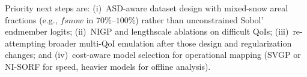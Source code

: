 \documentclass[11pt]{article}
\begin{document}
Priority next steps are:
(i)~ASD-aware dataset design with mixed-snow areal fractions (e.g., $fsnow$ in
$70\%$--$100\%$) rather than unconstrained Sobol' endmember logits;
(ii)~NIGP and lengthscale ablations on difficult QoIs;
(iii)~re-attempting broader multi-QoI emulation after those design and regularization
changes; and
(iv)~cost-aware model selection for operational mapping (SVGP or NI-SORF for speed,
heavier models for offline analysis).



\end{document}
